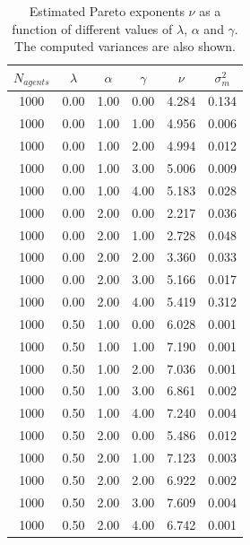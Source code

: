 \documentclass[11pt,a4paper,titlepage]{article}
\begin{document}
\begin{table}[ht!]
\centering
\caption{Estimated Pareto exponents $\nu$ as a function of different values of  $\lambda$, $\alpha$ and $\gamma$. The computed variances are also shown.} \label{tab:gamma}
\begin{tabular}{| c | c | c | c | c | c |} \hline
\textbf{$N_{agents}$} & $\lambda$ & $\alpha$ & $\gamma$ &  $\nu$ & $\sigma^2_m$\\ \hline
1000 & 0.00 & 1.00 & 0.00 & 4.284 & 0.134 \\ \hline
1000 & 0.00 & 1.00 & 1.00 & 4.956 & 0.006 \\ \hline
1000 & 0.00 & 1.00 & 2.00 & 4.994 & 0.012 \\ \hline
1000 & 0.00 & 1.00 & 3.00 & 5.006 & 0.009 \\ \hline
1000 & 0.00 & 1.00 & 4.00 & 5.183 & 0.028 \\ \hline

1000 & 0.00 & 2.00 & 0.00 & 2.217 & 0.036 \\ \hline
1000 & 0.00 & 2.00 & 1.00 & 2.728 & 0.048 \\ \hline
1000 & 0.00 & 2.00 & 2.00 & 3.360 & 0.033 \\ \hline
1000 & 0.00 & 2.00 & 3.00 & 5.166 & 0.017 \\ \hline
1000 & 0.00 & 2.00 & 4.00 & 5.419 & 0.312 \\ \hline

1000 & 0.50 & 1.00 & 0.00 & 6.028 & 0.001 \\ \hline
1000 & 0.50 & 1.00 & 1.00 & 7.190 & 0.001 \\ \hline
1000 & 0.50 & 1.00 & 2.00 & 7.036 & 0.001 \\ \hline
1000 & 0.50 & 1.00 & 3.00 & 6.861 & 0.002 \\ \hline
1000 & 0.50 & 1.00 & 4.00 & 7.240 & 0.004 \\ \hline

1000 & 0.50 & 2.00 & 0.00 & 5.486 & 0.012 \\ \hline
1000 & 0.50 & 2.00 & 1.00 & 7.123 & 0.003 \\ \hline
1000 & 0.50 & 2.00 & 2.00 & 6.922 & 0.002 \\ \hline
1000 & 0.50 & 2.00 & 3.00 & 7.609 & 0.004 \\ \hline
1000 & 0.50 & 2.00 & 4.00 & 6.742 & 0.001 \\ \hline

\end{tabular}
\end{table}
\end{document}

